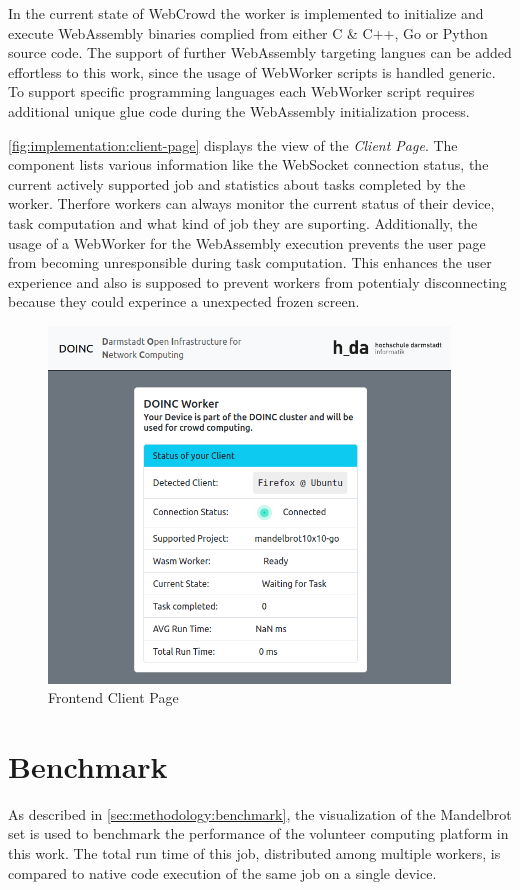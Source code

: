 In the current state of WebCrowd the worker is implemented to initialize and execute WebAssembly binaries complied from either C \& C++, Go or Python source code. The support of further WebAssembly targeting langues can be added effortless to this work, since the usage of WebWorker scripts is handled generic. To support specific programming languages each WebWorker script requires additional unique glue code during the WebAssembly initialization process.

\autoref{fig:implementation:client-page} displays the view of the \emph{Client Page}. The component lists various information like the WebSocket connection status, the current actively supported job and statistics about tasks completed by the worker. Therfore workers can always monitor the current status of their device, task computation and what kind of job they are suporting. Additionally, the usage of a WebWorker for the WebAssembly execution prevents the user page from becoming unresponsible during task computation. This enhances the user experience and also is supposed to prevent workers from potentialy disconnecting because they could experince a unexpected frozen screen. 
\begin{figure}[htbp]
    \centering
    \includegraphics[width=0.95\textwidth]{gfx/figures/client-page.png}
    \caption{Frontend Client Page}
    \label{fig:implementation:client-page}
\end{figure}

\section{Benchmark}
\label{sec:implementation:benchmark}
As described in \autoref{sec:methodology:benchmark}, the visualization of the Mandelbrot set is used to benchmark the performance of the volunteer computing platform in this work. The total run time of this job, distributed among multiple workers, is compared to native code execution of the same job on a single device.

